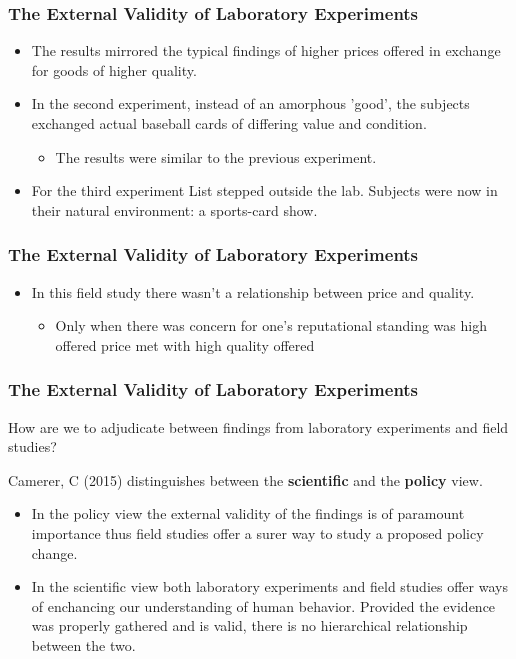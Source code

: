 \documentclass{beamer}
\begin{document}
\begin{frame}
	\frametitle{The External Validity of Laboratory Experiments}

	
	\begin{itemize}
		\item The results mirrored the typical findings of higher prices offered in exchange for goods of higher quality.
		\item In the second experiment, instead of an amorphous 'good', the subjects exchanged actual baseball cards of differing value and condition.
		\begin{itemize}
			\item The results were similar to the previous experiment.
		\end{itemize}
		\item For the third experiment List stepped outside the lab. Subjects were now in their natural environment: a sports-card show.
	\end{itemize}
\end{frame}

\begin{frame}
	\frametitle{The External Validity of Laboratory Experiments}
	
	\begin{itemize}

		\item In this field study there wasn't a relationship between price and quality.
		\begin{itemize}
			\item Only when there was concern for one's reputational standing was high offered price met with high quality offered
		\end{itemize} 
	\end{itemize}
\end{frame}

\begin{frame}
	\frametitle{The External Validity of Laboratory Experiments}
	
	How are we to adjudicate between findings from laboratory experiments and field studies? 
	
	Camerer, C (2015) distinguishes between the \textbf{scientific} and the \textbf{policy} view.
	\begin{itemize}
		\item In the policy view the external validity of the findings is of paramount importance thus field studies offer a surer way to study a proposed policy change.
		\item In the scientific view both laboratory experiments and field studies offer ways of enchancing our understanding of human behavior. Provided the evidence was properly gathered and is valid, there is no hierarchical relationship between the two.
	\end{itemize}
	
\end{frame}
\end{document}
